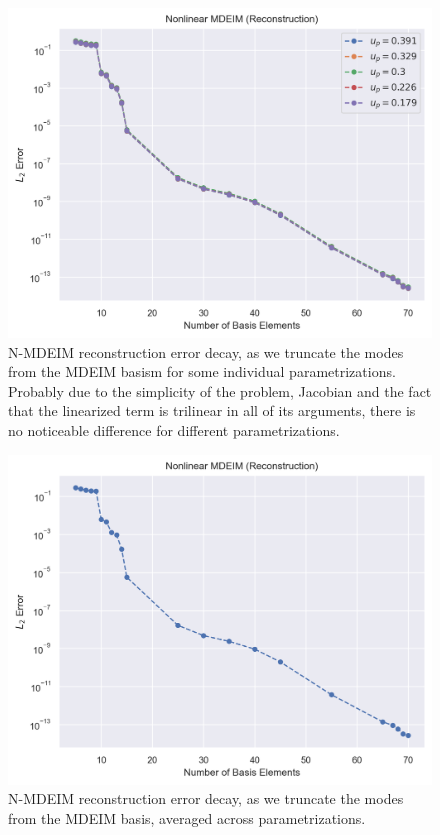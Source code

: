 \documentclass[../../thesis.tex]{subfiles}
\begin{document}
\begin{figure}[h]
    \centering
    \includegraphics[width=1\columnwidth]{research_project/piston/figures/mdeim_certification/nonlinear_error_decay_by_parameter.png}
    \caption{N-MDEIM reconstruction error decay, as we truncate the modes from the MDEIM basism
    for some individual parametrizations.
    Probably due to the simplicity of the problem, Jacobian and the fact that the linearized term is trilinear in
    all of its arguments, there is no noticeable difference for different parametrizations.}
    \label{fig:nonlinear_error_decay_from_fom_by_parameter}
\end{figure}

\begin{figure}[h]
    \centering
    \includegraphics[width=1\columnwidth]{research_project/piston/figures/mdeim_certification/nonlinear_error_decay_from_fom.png}
    \caption{N-MDEIM reconstruction error decay, as we truncate the modes from the MDEIM basis, averaged across parametrizations.}
    \label{fig:nonlinear_error_decay_from_fom}
\end{figure}
\end{document}
